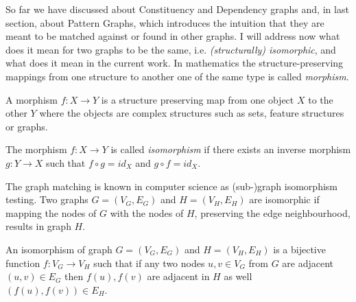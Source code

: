 So far we have discussed about Constituency and Dependency graphs and, in last section, about Pattern Graphs, which introduces the intuition that they are meant to be matched against or found in other graphs. I will address now what does it mean for two graphs to be the same, i.e. \textit{(structurally) isomorphic}, and what does it mean in the current work. In mathematics the structure-preserving mappings from one structure to another one of the same type is called \textit{morphism}. 

\begin{definition}[Morphism]\label{def:morphism}
    A morphism $f:X \rightarrow Y$ is a structure preserving map from one object $X$ to the other $Y$ where the objects are complex structures such as sets, feature structures or graphs.
\end{definition}




\begin{definition}[Isomorphism]\label{def:isomorphism}
    The morphism $f:X \rightarrow Y$ is called \textit{isomorphism} if there exists an inverse morphism $g:Y \rightarrow X$ such that $f \circ g = id_{X}$ and $ g \circ f = id_{X}$.
\end{definition}

The graph matching is known in computer science as (sub-)graph isomorphism testing. Two graphs $G=(V_G,E_G)$ and $H=(V_H,E_H)$ are isomorphic if mapping the nodes of $G$ with the nodes of $H$, preserving the edge neighbourhood, results in graph $H$. 

\begin{definition}\label{def:gisomorphism}
    An isomorphism of graph $G=(V_G,E_G)$ and $H=(V_H,E_H)$ is a bijective function $f:V_G \rightarrow V_H$ such that if any two nodes  $u,v \in V_G$ from $G$ are adjacent $(u,v) \in E_G$ then $f(u), f(v)$ are adjacent in $H$ as well $(f(u), f(v)) \in E_H $.
\end{definition}

